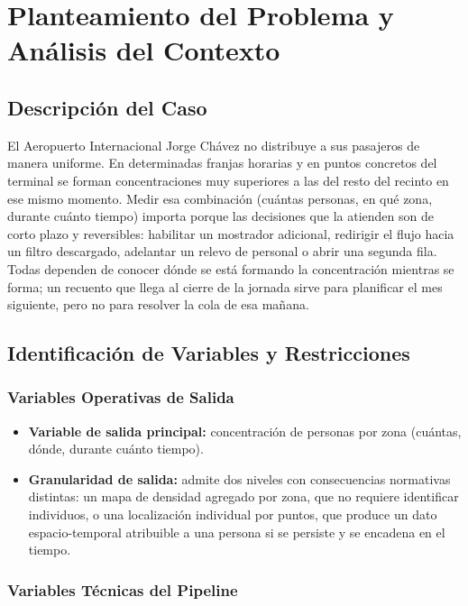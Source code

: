 \section{Planteamiento del Problema y Análisis del Contexto}
\label{sec:planteamiento}

\subsection{Descripción del Caso}
\label{subsec:descripcion-caso}

El Aeropuerto Internacional Jorge Chávez no distribuye a sus pasajeros de manera
uniforme. En determinadas franjas horarias y en puntos concretos del terminal se forman
concentraciones muy superiores a las del resto del recinto en ese mismo momento. Medir esa
combinación (cuántas personas, en qué zona, durante cuánto tiempo) importa porque las
decisiones que la atienden son de corto plazo y reversibles: habilitar un mostrador adicional,
redirigir el flujo hacia un filtro descargado, adelantar un relevo de personal o abrir una segunda
fila. Todas dependen de conocer dónde se está formando la concentración mientras se forma; un
recuento que llega al cierre de la jornada sirve para planificar el mes siguiente, pero no para
resolver la cola de esa mañana.

\subsection{Identificación de Variables y Restricciones}
\label{subsec:variables-restricciones}

\subsubsection{Variables Operativas de Salida}

\begin{itemize}
  \item \textbf{Variable de salida principal:} concentración de personas por zona (cuántas,
  dónde, durante cuánto tiempo).
  \item \textbf{Granularidad de salida:} admite dos niveles con consecuencias normativas
  distintas: un mapa de densidad agregado por zona, que no requiere identificar
  individuos, o una localización individual por puntos, que produce un dato
  espacio-temporal atribuible a una persona si se persiste y se encadena en el tiempo.
\end{itemize}

\subsubsection{Variables Técnicas del Pipeline}

